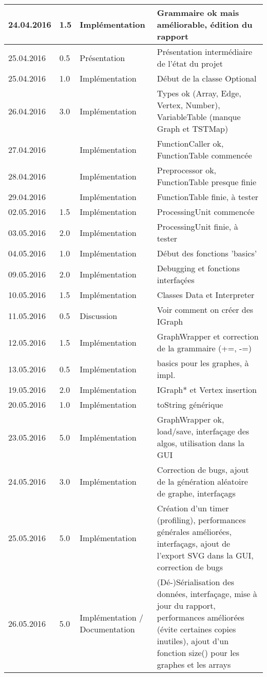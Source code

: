\documentclass[french]{article}
\begin{document}
\begin{longtable}{p{}|p{}|p{}|p{}}
		24.04.2016 & 1.5 & Implémentation & Grammaire ok mais améliorable, édition du rapport\\ 
		\hline
		25.04.2016 & 0.5 & Présentation & Présentation intermédiaire de l'état du projet\\
		25.04.2016 & 1.0 & Implémentation & Début de la classe Optional\\
		26.04.2016 & 3.0 & Implémentation & Types ok (Array, Edge, Vertex, Number), VariableTable (manque Graph et TSTMap)\\
		27.04.2016 & & Implémentation & FunctionCaller ok, FunctionTable commencée\\
		28.04.2016 & & Implémentation & Preprocessor ok, FunctionTable presque finie\\
		29.04.2016 & & Implémentation & FunctionTable finie, à tester\\
		\hline
		02.05.2016 & 1.5 & Implémentation & ProcessingUnit commencée\\
		03.05.2016 & 2.0 & Implémentation & ProcessingUnit finie, à tester\\
		04.05.2016 & 1.0 & Implémentation & Début des fonctions 'basics'\\
		\hline 
		09.05.2016 & 2.0 & Implémentation & Debugging et fonctions interfaçées\\
		10.05.2016 & 1.5 & Implémentation & Classes Data et Interpreter\\
		11.05.2016 & 0.5 & Discussion & Voir comment on créer des IGraph\\
		12.05.2016 & 1.5 & Implémentation & GraphWrapper et correction de la grammaire (+=, -=)\\
		13.05.2016 & 0.5 & Implémentation & basics pour les graphes, à impl.\\
		\hline
		19.05.2016 & 2.0 & Implémentation & IGraph* et Vertex insertion\\
		20.05.2016 & 1.0 & Implémentation & toString générique\\
		\hline
		23.05.2016 & 5.0 & Implémentation & GraphWrapper ok, load/save, interfaçage des algos, utilisation dans la GUI\\
		24.05.2016 & 3.0 & Implémentation & Correction de bugs, ajout de la génération aléatoire de graphe, interfaçags\\
		25.05.2016 & 5.0 & Implémentation & Création d'un timer (profiling), performances générales améliorées, interfaçags, ajout de l'export SVG dans la GUI, correction de bugs\\
		26.05.2016 & 5.0 & Implémentation / Documentation & (Dé-)Sérialisation des données, interfaçage, mise à jour du rapport, performances améliorées (évite certaines copies inutiles), ajout d'un fonction size() pour les graphes et les arrays\\
	\end{longtable}
	
\end{document}
